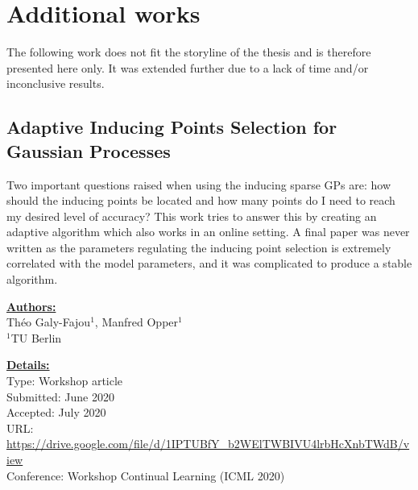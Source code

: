 \chapter{Additional works} 
\label{appendix:worshoppapers}
The following work does not fit the storyline of the thesis and is therefore presented here only.
It was extended further due to a lack of time and/or inconclusive results.

\section{Adaptive Inducing Points Selection for Gaussian Processes}

Two important questions raised when using the inducing sparse \ac{GPs} are: how should the inducing points be located and how many points do I need to reach my desired level of accuracy?
This work tries to answer this by creating an adaptive algorithm which also works in an online setting.
A final paper was never written as the parameters regulating the inducing point selection is extremely correlated with the model parameters, and it was complicated to produce a stable algorithm.

\textbf{\underline{Authors:}}\\
Th\'eo Galy-Fajou$^1$, Manfred Opper$^1$\\
\small{$^1$TU Berlin}

\textbf{\underline{Details:}}\\
Type: Workshop article\\
Submitted: June 2020\\
Accepted: July 2020\\
URL: \url{https://drive.google.com/file/d/1IPTUBfY_b2WElTWBIVU4lrbHcXnbTWdB/view}\\
Conference: Workshop Continual Learning (ICML 2020)\\








% 